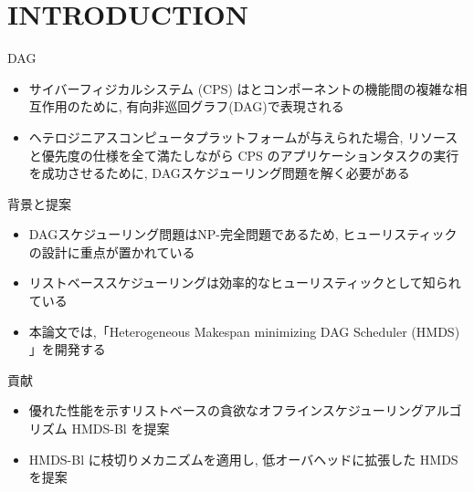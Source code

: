 
\section{INTRODUCTION}
\label{sec: introduction}

\begin{frame}{DAG}
    \begin{itemize}
        \item サイバーフィジカルシステム (CPS) はとコンポーネントの機能間の複雑な相互作用のために, 有向非巡回グラフ(DAG)で表現される
        \item ヘテロジニアスコンピュータプラットフォームが与えられた場合, リソースと優先度の仕様を全て満たしながら CPS のアプリケーションタスクの実行を成功させるために, DAGスケジューリング問題を解く必要がある
    \end{itemize}
\end{frame}

\begin{frame}{背景と提案}
    \begin{itemize}
        \item DAGスケジューリング問題はNP-完全問題であるため, ヒューリスティックの設計に重点が置かれている
        \item リストベーススケジューリングは効率的なヒューリスティックとして知られている
        \item 本論文では,「Heterogeneous Makespan minimizing DAG Scheduler (HMDS) 」を開発する
    \end{itemize}
\end{frame}

\begin{frame}{貢献}
    \begin{itemize}
        \item 優れた性能を示すリストベースの貪欲なオフラインスケジューリングアルゴリズム HMDS-Bl を提案
        \item HMDS-Bl に枝切りメカニズムを適用し, 低オーバヘッドに拡張した HMDS を提案
    \end{itemize}
\end{frame}
